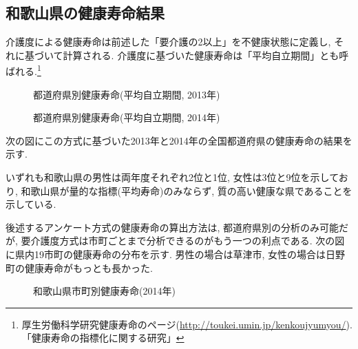 
%



%
%
%
\subsection{和歌山県の健康寿命結果}
介護度による健康寿命は前述した「要介護の2以上」を不健康状態に定義し, それに基づいて計算される. 介護度に基づいた健康寿命は「平均自立期間」とも呼ばれる.\footnote{厚生労働科学研究健康寿命のページ(\url{http://toukei.umin.jp/kenkoujyumyou/}).
	「健康寿命の指標化に関する研究」
}
\begin{figure}[h!]
	\begin{center}
		\caption{都道府県別健康寿命(平均自立期間, 2013年)}\label{fig1}
	\end{center}
\end{figure}
\begin{figure}[h!]
	\begin{center}
		\caption{都道府県別健康寿命(平均自立期間, 2014年)}\label{fig1}
	\end{center}
\end{figure}
次の図にこの方式に基づいた2013年と2014年の全国都道府県の健康寿命の結果を示す.

いずれも和歌山県の男性は両年度それぞれ2位と1位, 女性は3位と9位を示しており, 和歌山県が量的な指標(平均寿命)のみならず, 質の高い健康な県であることを示している.

後述するアンケート方式の健康寿命の算出方法は,
都道府県別の分析のみ可能だが,
要介護度方式は市町ごとまで分析できるのがもう一つの利点である.
次の図に県内19市町の健康寿命の分布を示す. 男性の場合は草津市, 女性の場合は日野町の健康寿命がもっとも長かった.

\begin{figure}[h!]
	\begin{center}
		\caption{和歌山県市町別健康寿命(2014年)}\label{fig1}
	\end{center}
\end{figure}




